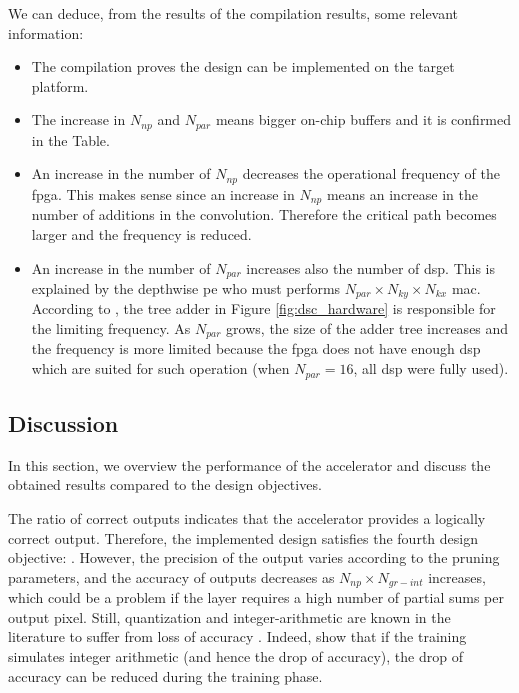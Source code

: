We can deduce, from the results of the compilation results, some relevant information:
\begin{itemize}
    \item The compilation proves the design can be implemented on the target platform.
    \item The increase in $N_{np}$ and $N_{par}$ means bigger on-chip buffers and it is confirmed in the Table.
    \item An increase in the number of $N_{np}$ decreases the operational frequency of the \acrshort{fpga}. This makes sense since an increase in $N_{np}$ means an increase in the number of additions in the convolution. Therefore the critical path becomes larger and the frequency is reduced.
    \item An increase in the number of $N_{par}$ increases also the number of \acrshort{dsp}. This is explained by the depthwise \acrshort{pe} who must performs $N_{par} \times N_{ky} \times N_{kx}$ \acrshort{mac}. According to \textcite{bai_cnn_2018}, the tree adder in Figure \ref{fig:dsc_hardware} is responsible for the limiting frequency. As $N_{par}$ grows, the size of the adder tree increases and the frequency is more limited because the \acrshort{fpga} does not have enough \acrshort{dsp} which are suited for such operation (when $N_{par} = 16$, all \acrshort{dsp} were fully used).
\end{itemize}
%
\subsection{Discussion} \label{subs:discus}
%
In this section, we overview the performance of the accelerator and discuss the obtained results compared to the design objectives.

The ratio of correct outputs indicates that the accelerator provides a logically correct output. Therefore, the implemented design satisfies the fourth design objective: . However, the precision of the output varies according to the pruning parameters, and the accuracy of outputs decreases as $N_{np} \times N_{gr-int}$ increases, which could be a problem if the layer requires a high number of partial sums per output pixel. Still, quantization and integer-arithmetic are known in the literature to suffer from loss of accuracy \cite{wu_quantized_2016, jacob_quantization_2017}. Indeed, \textcite{wu_quantized_2016, jacob_quantization_2017} show that if the training simulates integer arithmetic (and hence the drop of accuracy), the drop of accuracy can be reduced during the training phase.

